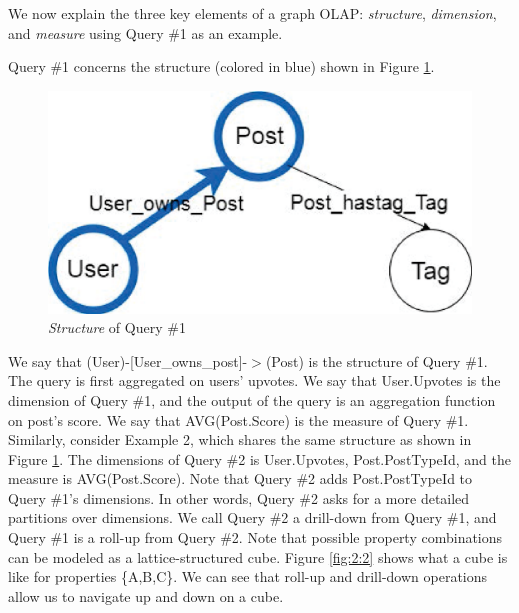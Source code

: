We now explain the three key elements of a graph OLAP: \textit{structure}, \textit{dimension}, and \textit{measure}  using Query \#1 as an example.


Query \#1 concerns the structure (colored in blue) shown in Figure \ref{fig:2:1}.

\begin{figure}[H]
	\centering
	\includegraphics[scale=0.5]{pic/meta1.eps}
	\caption{\textit{Structure} of Query \#1}
	\label{fig:2:1}
\end{figure}



We say that (User)-[User\_owns\_post]-$>$(Post) is the structure of Query \#1. The query is first aggregated on users' upvotes. We say that {User.Upvotes} is the dimension of Query \#1, and the output of the query is an aggregation function on post’s score.  We say that {AVG(Post.Score)} is the measure of Query \#1. Similarly, consider Example 2, which shares the same structure as shown in Figure \ref{fig:2:1}. The dimensions of Query \#2 is {User.Upvotes, Post.PostTypeId}, and the measure is {AVG(Post.Score)}. Note that Query \#2 adds Post.PostTypeId to Query \#1’s dimensions. In other words, Query \#2 asks for a more detailed partitions over dimensions. We call Query \#2 a drill-down from Query \#1, and  Query \#1 is a roll-up from Query \#2. Note that possible property combinations can be modeled as a lattice-structured cube. Figure \ref{fig:2:2} shows what a cube is like for properties \{A,B,C\}. We can see that roll-up and drill-down operations allow us to navigate up and down on a cube.


